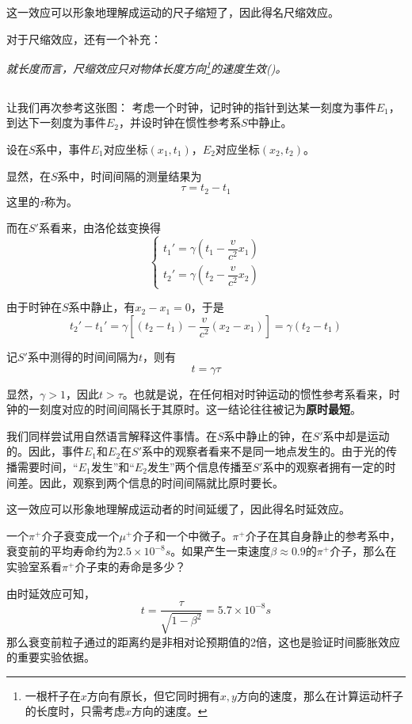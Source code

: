 这一效应可以形象地理解成运动的尺子缩短了，因此得名尺缩效应。

对于尺缩效应，还有一个补充：
\begin{center}
	\em 就长度而言，尺缩效应只对物体长度方向\footnote{\eg 一根杆子在$x$方向有原长，但它同时拥有$x,y$方向的速度，那么在计算运动杆子的长度时，只需考虑$x$方向的速度。}的速度生效()。
\end{center}

\subsection[动钟变慢]{}
让我们再次参考这张图：
考虑一个时钟，记时钟的指针到达某一刻度为事件$E_1$，到达下一刻度为事件$E_2$，并设时钟在惯性参考系$S$中静止。

设在$S$系中，事件$E_1$对应坐标$(x_1,t_1)$，$E_2$对应坐标$(x_2,t_2)$。

显然，在$S$系中，时间间隔的测量结果为
\[\tau=t_2-t_1\] 
这里的$\tau$称为。

而在$S'$系看来，由洛伦兹变换得
\[\left\{\begin{array}{l}
	t_1'=\gamma(t_1-\dfrac{v}{c^2} x_1)\\[1ex]
	t_2'=\gamma(t_2-\dfrac{v}{c^2} x_2)
\end{array}\right.\]

由于时钟在$S$系中静止，有$x_2-x_1=0$，于是
\[t_2'-t_1'=\gamma[(t_2-t_1)-\dfrac{v}{c^2}(x_2-x_1)]=\gamma(t_2-t_1)\]

记$S'$系中测得的时间间隔为$t$，则有
\begin{equation}
	t=\gamma\tau
\end{equation}

显然，$\gamma > 1$，因此$t>\tau$。也就是说，在任何相对时钟运动的惯性参考系看来，时钟的一刻度对应的时间间隔长于其原时。这一结论往往被记为\textbf{原时最短}。

我们同样尝试用自然语言解释这件事情。在$S$系中静止的钟，在$S'$系中却是运动的。因此，事件$E_1$和$E_2$在$S'$系中的观察者看来不是同一地点发生的。由于光的传播需要时间，``$E_1$发生''和``$E_2$发生''两个信息传播至$S'$系中的观察者拥有一定的时间差。因此，观察到两个信息的时间间隔就比原时要长。

这一效应可以形象地理解成运动者的时间延缓了，因此得名时延效应。
\begin{ex}[$\pi^+$介子衰变]
    一个$\pi^+$介子衰变成一个$\mu^+$介子和一个中微子。$\pi^+$介子在其自身静止的参考系中，衰变前的平均寿命约为$2.5\times10^{-8}s$。如果产生一束速度$\beta\approx 0.9$的$\pi^+$介子，那么在实验室系看$\pi^+$介子束的寿命是多少？
\end{ex}
\begin{so}[$\pi^+$介子衰变]
    由时延效应可知，
    \[t=\frac{\tau}{\sqrt{1-\beta^2}}=5.7\times10^{-8}s\]
    那么衰变前粒子通过的距离约是非相对论预期值的2倍，这也是验证时间膨胀效应的重要实验依据。
\end{so}
